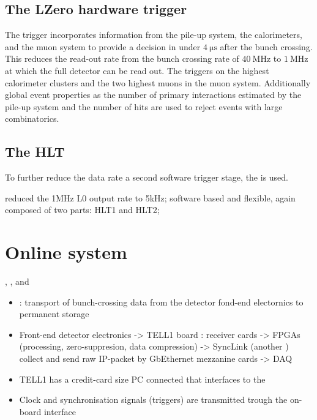 \subsection{The \acl*{LZero} hardware trigger}
\label{sec:lhcb_experiment:trigger:lzero}

The \LZero trigger incorporates information from the \VELO pile-up system, the
calorimeters, and the muon system to provide a decision in under
$\SI{4}{\micro\second}$ after the bunch crossing. This reduces the read-out rate
from the \LHC bunch crossing rate of $\SI{40}{\mega\hertz}$ to
$\SI{1}{\mega\hertz}$ at which the full detector can be read out. The \LZero
triggers on the highest \ET calorimeter clusters and the two highest \pT muons
in the muon system. Additionally global event properties as the number of
primary \protonproton interactions estimated by the \VELO pile-up system and the
number of \SPD hits are used to reject events with large combinatorics.

\newpage
\subsection{The \acl*{HLT}}
\label{sec:lhcb_experiment:trigger:hlt}

To further reduce the data rate a second software trigger stage, the \HLT is used. 

reduced the 1MHz L0 output rate to 5kHz; software based and flexible, again composed of two parts: HLT1 and HLT2; 

\section{Online system}
\DAQ, \TFC, and \ECS
\begin{itemize}
  \item \DAQ: transport of bunch-crossing data from the detector fond-end electornics to permanent storage
  \item Front-end detector electronics -> TELL1 board : receiver cards -> \acp{FPGA} (processing, zero-suppresion, data compression) -> SyncLink (another \FPGA) collect and send raw IP-packet by GbEthernet mezzanine cards -> DAQ
  \item TELL1 has a credit-card size PC connected that interfaces to the \ECS
  \item Clock and synchronisation signals (\eg triggers) are transmitted trough the on-board \TTC interface
\end{itemize}

